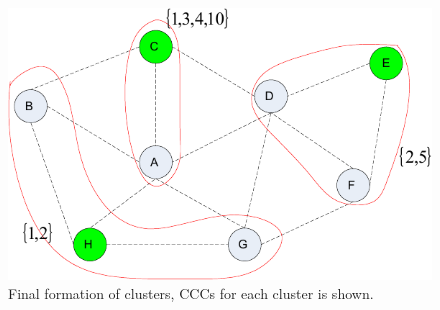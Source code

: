 \documentclass[10pt,journal,compsoc]{IEEEtran}
\theoremstyle{mytheoremstyle}
\theoremstyle{mytheoremstyle}
\theoremstyle{mytheoremstyle}
\begin{document}

\begin{figure}[h]
  \centering
  \includegraphics[width=0.5\linewidth]{final_clustering_ross.pdf}
  \caption{Final formation of clusters, CCCs for each cluster is shown.}
  \label{fig4}
\end{figure}
\end{document}
